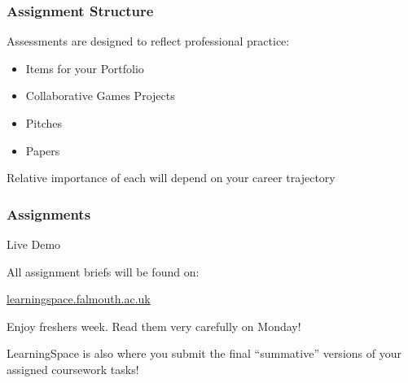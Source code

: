 \begin{frame}
	\frametitle{Assignment Structure}
	
	
	Assessments are designed to reflect professional practice:
	
	\begin{itemize}
		\item Items for your Portfolio
		\item Collaborative Games Projects
		\item Pitches
		\item Papers
	\end{itemize}

	Relative importance of each will depend on your career trajectory

\end{frame}











\begin{frame}
	\frametitle{Assignments}
	
	Live Demo
	
	\vspace{3em}
	
	All assignment briefs will be found on:
	
	\vspace{0.5em}
	
	\indent \url{learningspace.falmouth.ac.uk}
	
	\vspace{0.5em}
	
	Enjoy freshers week. Read them very carefully on Monday!
	
	\vspace{0.5em}
	
	LearningSpace is also where you submit the final ``summative'' versions of your assigned coursework tasks!
	
\end{frame}

